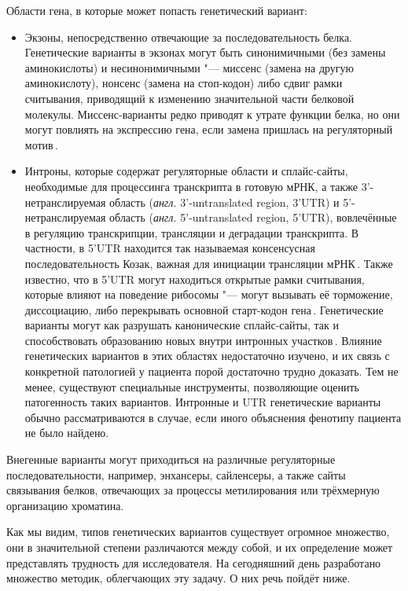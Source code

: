 \documentclass[a4paper,14pt]{extarticle}
\newcommand{\anglia}[1]{\textit{англ.} \textenglish{#1}}
\begin{document}
Области гена, в которые может попасть генетический вариант:

\begin{itemize}
\item Экзоны, непосредственно отвечающие за последовательность белка.
Генетические варианты в экзонах могут быть синонимичными (без замены аминокислоты) и несинонимичными "--- миссенс (замена на другую аминокислоту), нонсенс (замена на стоп-кодон) либо сдвиг рамки считывания, приводящий к изменению значительной части белковой молекулы.
Миссенс-варианты редко приводят к утрате функции белка, но они могут повлиять на экспрессию гена, если замена пришлась на регуляторный мотив\,\cite{j_Brea_Fernandez_2011}.
\item Интроны, которые содержат регуляторные области и сплайс-сайты, необходимые для процессинга транскрипта в готовую мРНК, а также 3'\hyp{}нетранслируемая область (\anglia{3'\hyp{}untranslated region, 3'UTR}) и 5'\hyp{}нетранслируемая область (\anglia{5'\hyp{}untranslated region, 5'UTR}), вовлечённые в регуляцию транскрипции, трансляции и деградации транскрипта.
В частности, в 5'UTR находится так называемая консенсусная последовательность Козак, важная для инициации трансляции мРНК\,\cite{Kozak_1987}.
Также известно, что в 5'UTR могут находиться открытые рамки считывания, которые влияют на поведение рибосомы "--- могут вызывать её торможение, диссоциацию, либо перекрывать основной старт-кодон гена\,\cite{Young_2016}.
Генетические варианты могут как разрушать канонические сплайс-сайты, так и способствовать образованию новых внутри интронных участков\,\cite{Abramowicz_2018}.
Влияние генетических вариантов в этих областях недостаточно изучено, и их связь с конкретной патологией у пациента порой достаточно трудно доказать.
Тем не менее, существуют специальные инструменты, позволяющие оценить патогенность таких вариантов.
Интронные и UTR генетические варианты обычно рассматриваются в случае, если иного объяснения фенотипу пациента не было найдено.
\end{itemize}

Внегенные варианты могут приходиться на различные регуляторные последовательности, например, энхансеры, сайленсеры, а также сайты связывания белков, отвечающих за процессы метилирования или трёхмерную организацию хроматина.

Как мы видим, типов генетических вариантов существует огромное множество, они в значительной степени различаются между собой, и их определение может представлять трудность для исследователя.
На сегодняшний день разработано множество методик, облегчающих эту задачу.
О них речь пойдёт ниже.
\end{document}
